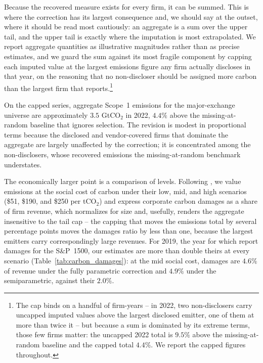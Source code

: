 \documentclass[a4paper,12pt]{article}
\newcommand{\citet}[1]{\textcite{#1}}
\begin{document}
Because the recovered measure exists for every firm, it can be summed. This is where the correction has its largest consequence and, we should say at the outset, where it should be read most cautiously: an aggregate is a sum over the upper tail, and the upper tail is exactly where the imputation is most extrapolated. We report aggregate quantities as illustrative magnitudes rather than as precise estimates, and we guard the sum against its most fragile component by capping each imputed value at the largest emissions figure any firm actually discloses in that year, on the reasoning that no non-discloser should be assigned more carbon than the largest firm that reports.\footnote{The cap binds on a handful of firm-years -- in 2022, two non-disclosers carry uncapped imputed values above the largest disclosed emitter, one of them at more than twice it -- but because a sum is dominated by its extreme terms, those few firms matter: the uncapped 2022 total is $9.5\%$ above the missing-at-random baseline and the capped total $4.4\%$. We report the capped figures throughout.}

On the capped series, aggregate Scope~1 emissions for the major-exchange universe are approximately $3.5$ GtCO$_2$ in 2022, $4.4\%$ above the missing-at-random baseline that ignores selection. The revision is modest in proportional terms because the disclosed and vendor-covered firms that dominate the aggregate are largely unaffected by the correction; it is concentrated among the non-disclosers, whose recovered emissions the missing-at-random benchmark understates.

The economically larger point is a comparison of levels. Following \citet{greenstone2023mandatory}, we value emissions at the social cost of carbon under their low, mid, and high scenarios (\$51, \$190, and \$250 per tCO$_2$) and express corporate carbon damages as a share of firm revenue, which normalizes for size and, usefully, renders the aggregate insensitive to the tail cap -- the capping that moves the emissions total by several percentage points moves the damages ratio by less than one, because the largest emitters carry correspondingly large revenues. For 2019, the year for which \citet{greenstone2023mandatory} report damages for the S\&P~1500, our estimates are more than double theirs at every scenario (Table~\ref{tab:carbon_damages}): at the mid social cost, damages are $4.6\%$ of revenue under the fully parametric correction and $4.9\%$ under the semiparametric, against their $2.0\%$.
\end{document}
